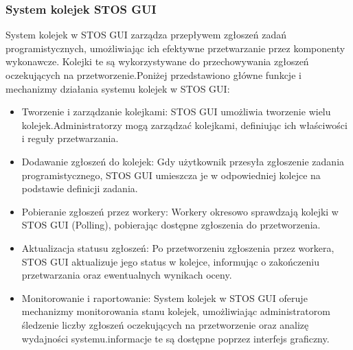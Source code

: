 \documentclass[12pt,a4paper]{article}
\begin{document}


\subsubsection{System kolejek STOS GUI}
System kolejek w STOS GUI zarządza przepływem zgłoszeń zadań programistycznych, umożliwiając ich efektywne przetwarzanie przez komponenty wykonawcze. Kolejki te są wykorzystywane do przechowywania zgłoszeń oczekujących na przetworzenie.\@ Poniżej przedstawiono główne funkcje i mechanizmy działania systemu kolejek w STOS GUI:\
\begin{itemize}
    \item Tworzenie i zarządzanie kolejkami: STOS GUI umożliwia tworzenie wielu kolejek.\@ Administratorzy mogą zarządzać kolejkami, definiując ich właściwości i reguły przetwarzania.
    \item Dodawanie zgłoszeń do kolejek: Gdy użytkownik przesyła zgłoszenie zadania programistycznego, STOS GUI umieszcza je w odpowiedniej kolejce na podstawie definicji zadania.
    \item Pobieranie zgłoszeń przez workery: Workery okresowo sprawdzają kolejki w STOS GUI (Polling), pobierając dostępne zgłoszenia do przetworzenia.
    \item Aktualizacja statusu zgłoszeń: Po przetworzeniu zgłoszenia przez workera, STOS GUI aktualizuje jego status w kolejce, informując o zakończeniu przetwarzania oraz ewentualnych wynikach oceny.
    \item Monitorowanie i raportowanie: System kolejek w STOS GUI oferuje mechanizmy monitorowania stanu kolejek, umożliwiając administratorom śledzenie liczby zgłoszeń oczekujących na przetworzenie oraz analizę wydajności systemu.\@ informacje te są dostępne poprzez interfejs graficzny.
\end{itemize}
\end{document}

